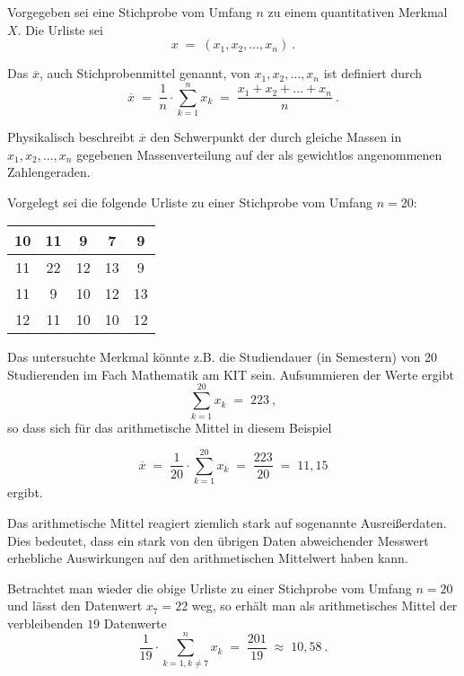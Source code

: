 \begin{MIntro}

Vorgegeben sei eine Stichprobe vom Umfang $n$ zu einem quantitativen Merkmal $X$. Die Urliste sei
$$
x\; =\; (x_{1},x_{2},\ldots ,x_{n})\: .
$$

\begin{MInfo}
Das  $\overline{x}$, auch Stichprobenmittel genannt, von $x_{1},x_{2},\ldots ,x_{n}$ ist definiert durch
$$
\overline{x}\; =\; \frac{1}{n}\cdot \sum\limits_{k=1} ^{n} x_{k}\;=\;\frac{x_{1}+x_{2}+\ldots +x_{n}}{n}\: .
$$
\end{MInfo}

Physikalisch beschreibt $\overline{x}$ den Schwerpunkt der durch gleiche Massen in $x_{1},x_{2},\ldots ,x_{n}$ gegebenen Massenverteilung auf der als gewichtlos angenommenen Zahlengeraden.

\begin{MExample}
Vorgelegt sei die folgende Urliste zu einer Stichprobe vom Umfang $n=20$:

\begin{center}
\begin{tabular}{|c|c|c|c|c|}
\hline
10 & 11 & 9 & 7 & 9 \\ \hline
11 & 22 & 12 & 13 & 9 \\ \hline
11 & 9 & 10 & 12 & 13 \\ \hline
12 & 11 & 10 & 10 & 12\\ \hline
\end{tabular}
\end{center}

Das untersuchte Merkmal könnte z.B. die Studiendauer (in Semestern) von 20 Studierenden im Fach Mathematik am KIT sein. Aufsummieren der Werte ergibt
$$
\sum\limits_{k=1}^{20}x_{k}\; =\;223\: ,
$$
so dass sich für das arithmetische Mittel in diesem Beispiel

$$
\overline{x}\;=\; \frac{1}{20}\cdot \sum\limits_{k=1}^{20}x_{k}\;=\; \frac{223}{20}\; =\; 11,15
$$
ergibt.
\end{MExample}

Das arithmetische Mittel reagiert ziemlich stark auf sogenannte Ausreißerdaten. Dies bedeutet, dass ein stark von den übrigen Daten abweichender Messwert erhebliche
Auswirkungen auf den arithmetischen Mittelwert haben kann.

\begin{MExample}
Betrachtet man wieder die obige Urliste zu einer Stichprobe vom Umfang $n=20$ und lässt den Datenwert $x_{7}=22$ weg, so erhält man als arithmetisches Mittel der verbleibenden $19$ Datenwerte
$$
\frac{1}{19}\cdot \sum\limits_{k=1,k\neq 7}^{n}x_{k}\;=\; \frac{201}{19}\; \approx\; 10,58\: .
$$
\end{MExample}


\end{MIntro}
